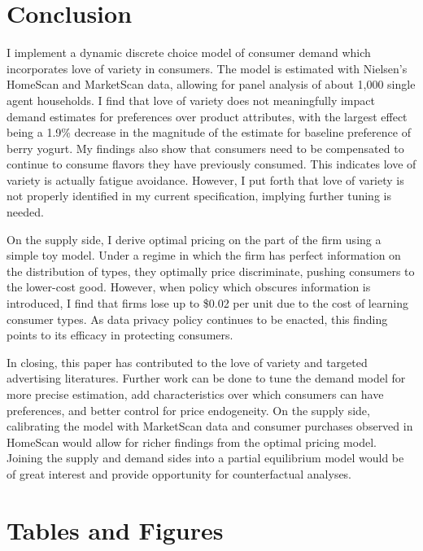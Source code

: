 \documentclass[11pt]{article}
\theoremstyle{definition}
\theoremstyle{remark}
\begin{document}
\section{Conclusion}

I implement a dynamic discrete choice model of consumer demand which incorporates love of variety in consumers. The model is estimated with Nielsen's HomeScan and MarketScan data, allowing for panel analysis of about 1,000 single agent households. I find that love of variety does not meaningfully impact demand estimates for preferences over product attributes, with the largest effect being a 1.9\% decrease in the magnitude of the estimate for baseline preference of berry yogurt. My findings also show that consumers need to be compensated to continue to consume flavors they have previously consumed. This indicates love of variety is actually fatigue avoidance. However, I put forth that love of variety is not properly identified in my current specification, implying further tuning is needed. 

On the supply side, I derive optimal pricing on the part of the firm using a simple toy model. Under a regime in which the firm has perfect information on the distribution of types, they optimally price discriminate, pushing consumers to the lower-cost good. However, when policy which obscures information is introduced, I find that firms lose up to \$0.02 per unit due to the cost of learning consumer types. As data privacy policy continues to be enacted, this finding points to its efficacy in protecting consumers.

In closing, this paper has contributed to the love of variety and targeted advertising literatures. Further work can be done to tune the demand model for more precise estimation, add characteristics over which consumers can have preferences, and better control for price endogeneity. On the supply side, calibrating the model with MarketScan data and consumer purchases observed in HomeScan would allow for richer findings from the optimal pricing model. Joining the supply and demand sides into a partial equilibrium model would be of great interest and provide opportunity for counterfactual analyses. 


\newpage



\newpage
\section{Tables and Figures}
\end{document}
